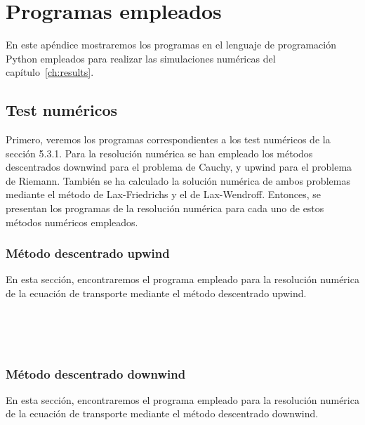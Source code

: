 \chapter{Programas empleados}

En este apéndice mostraremos los programas en el lenguaje de
programación Python empleados para realizar las simulaciones
numéricas del capítulo~\ref{ch:results}.

\section{Test numéricos}

Primero, veremos los programas correspondientes a los test numéricos
de la sección 5.3.1.
Para la resolución numérica se han empleado los métodos descentrados
downwind para el problema de Cauchy, y upwind para el problema de
Riemann.
También se ha calculado la solución numérica de ambos problemas
mediante el método de Lax-Friedrichs y el de Lax-Wendroff.
Entonces, se presentan los programas de la resolución numérica
para cada uno de estos métodos numéricos empleados.

\subsection{Método descentrado upwind}

En esta sección, encontraremos el programa empleado para la
resolución numérica de la ecuación de transporte mediante el método
descentrado upwind.

\begin{listing}[ht!]
    \tiny
    \centering
    \inputminted[firstline=1,lastline=2]{python}{upwind.py}
    \inputminted[firstline=4,lastline=7]{python}{upwind.py}
    \inputminted[firstline=10,lastline=11]{python}{upwind.py}
    \inputminted[firstline=35,lastline=35]{python}{upwind.py}
    \inputminted[firstline=38,lastline=53]{python}{upwind.py}
\end{listing}

\subsection{Método descentrado downwind}

En esta sección, encontraremos el programa empleado para la
resolución numérica de la ecuación de transporte mediante el método
descentrado downwind.

\begin{listing}[ht!]
    \tiny
    \centering
    \inputminted[firstline=1,lastline=2]{python}{downwind.py}
    \inputminted[firstline=4,lastline=7]{python}{downwind.py}
    \inputminted[firstline=10,lastline=11]{python}{downwind.py}
    \inputminted[firstline=35,lastline=35]{python}{downwind.py}
    \inputminted[firstline=38,lastline=53]{python}{downwind.py}
\end{listing}

